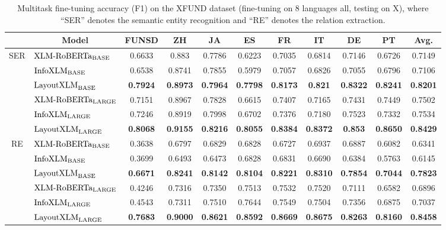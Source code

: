 \documentclass[11pt]{article}
\newcommand{\task}{\textsc{XFUND}\xspace}
\begin{document}
\begin{table*}[ht]
	\small
	\centering
	\begin{tabular}{c|lccccccccc}
		\toprule
& \multicolumn{1}{c}{\bf Model}      & \bf FUNSD & \bf ZH & \bf JA & \bf ES & \bf FR & \bf IT & \bf DE & \bf PT & \bf Avg. \\\midrule
		\multirow{6}{*}{SER} & $\textrm{XLM-RoBERTa}_{\rm BASE}$  & 0.6633 & 0.883  & 0.7786 & 0.6223 & 0.7035 & 0.6814 & 0.7146 & 0.6726 & 0.7149 \\
		                    & $\textrm{InfoXLM}_{\rm BASE}$      & 0.6538 & 0.8741 & 0.7855 & 0.5979 & 0.7057 & 0.6826 & 0.7055 & 0.6796 & 0.7106 \\
		                    & $\textrm{LayoutXLM}_{\rm BASE}$    & \bf 0.7924 & \bf 0.8973 & \bf 0.7964 & \bf 0.7798 & \bf 0.8173 & \bf 0.821  & \bf 0.8322 & \bf 0.8241 & \bf 0.8201 \\ \cmidrule{2-11}
		                    & $\textrm{XLM-RoBERTa}_{\rm LARGE}$ & 0.7151 & 0.8967 & 0.7828 & 0.6615 & 0.7407 & 0.7165 & 0.7431 & 0.7449 & 0.7502 \\
		                    & $\textrm{InfoXLM}_{\rm LARGE}$     & 0.7246 & 0.8919 & 0.7998 & 0.6702 & 0.7376 & 0.7180 & 0.7523 & 0.7332 & 0.7534 \\
		                    & $\textrm{LayoutXLM}_{\rm LARGE}$   & \bf 0.8068 & \bf 0.9155 & \bf 0.8216 & \bf 0.8055 & \bf 0.8384 & \bf 0.8372 & \bf 0.853  & \bf 0.8650 & \bf 0.8429 \\\midrule
		\multirow{6}{*}{RE} & $\textrm{XLM-RoBERTa}_{\rm BASE}$  &0.3638 & 0.6797 & 0.6829 & 0.6828 & 0.6727 & 0.6937 & 0.6887 & 0.6082 & 0.6341 \\
		                    & $\textrm{InfoXLM}_{\rm BASE}$      & 0.3699 & 0.6493 & 0.6473 & 0.6828 & 0.6831 & 0.6690 & 0.6384 & 0.5763 & 0.6145\\
		                    & $\textrm{LayoutXLM}_{\rm BASE}$    & \bf 0.6671 & \bf 0.8241 & \bf 0.8142 & \bf 0.8104 & \bf 0.8221 & \bf 0.8310 & \bf 0.7854 & \bf 0.7044 & \bf 0.7823\\ \cmidrule{2-11}
		                    & $\textrm{XLM-RoBERTa}_{\rm LARGE}$ &0.4246 & 0.7316 & 0.7350 & 0.7513 & 0.7532 & 0.7520 & 0.7111 & 0.6582 & 0.6896\\
		                    & $\textrm{InfoXLM}_{\rm LARGE}$     & 0.4543 & 0.7311 & 0.7510 & 0.7644 & 0.7549 & 0.7504 & 0.7356 & 0.6875 & 0.7037 \\
		                    & $\textrm{LayoutXLM}_{\rm LARGE}$   & \bf 0.7683 & \bf 0.9000 & \bf 0.8621 & \bf 0.8592 & \bf 0.8669 & \bf 0.8675 & \bf 0.8263 & \bf 0.8160 & \bf 0.8458 \\
		\bottomrule
	\end{tabular}
	\caption{Multitask fine-tuning accuracy (F1) on the \task dataset (fine-tuning on 8 languages all, testing on X), where ``SER'' denotes the semantic entity recognition and ``RE'' denotes the relation extraction.}
	\label{tab:all2x}
\end{table*}
\end{document}
